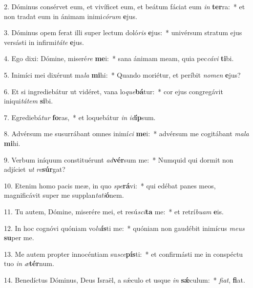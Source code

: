 2. Dóminus consérvet eum, et vivíficet eum, et beátum fáciat eum \textit{in} \textbf{ter}ra:~*  et non tradat eum in ánimam inimi\textit{có}\textit{rum} \textbf{e}jus.\

3. Dóminus opem ferat illi super lectum doló\textit{ris} \textbf{e}jus:~*  univérsum stratum ejus versásti in infirmi\textit{tá}\textit{te} \textbf{e}jus.\

4. Ego dixi: Dómine, miseré\textit{re} \textbf{me}i:~*  sana ánimam meam, quia pec\textit{cá}\textit{vi} \textbf{ti}bi.\

5. Inimíci mei dixérunt ma\textit{la} \textbf{mi}hi:~*  Quando moriétur, et períbit \textit{no}\textit{men} \textbf{e}jus?\

6. Et si ingrediebátur ut vidéret, vana lo\textit{que}\textbf{bá}tur:~*  cor ejus congregávit iniqui\textit{tá}\textit{tem} \textbf{si}bi.\

7. Egrediebá\textit{tur} \textbf{fo}ras,~*  et loquebátur \textit{in} \textit{id}\textbf{íp}sum.\

8. Advérsum me susurrábant omnes inimí\textit{ci} \textbf{me}i:~*  advérsum me cogitábant \textit{ma}\textit{la} \textbf{mi}hi.\

9. Verbum iníquum constituérunt \textit{ad}\textbf{vér}sum me:~*  Numquid qui dormit non adjíciet \textit{ut} \textit{re}\textbf{súr}gat?\

10. Etenim homo pacis meæ, in quo \textit{spe}\textbf{rá}vi:~*  qui edébat panes meos, magnificávit super me supplan\textit{ta}\textit{ti}\textbf{ó}nem.\

11. Tu autem, Dómine, miserére mei, et resú\textit{sci}\textbf{ta} me:~*  et retrí\textit{bu}\textit{am} \textbf{e}is.\

12. In hoc cognóvi quóniam vo\textit{lu}\textbf{ís}ti me:~*  quóniam non gaudébit inimícus \textit{me}\textit{us} \textbf{su}per me.\

13. Me autem propter innocéntiam su\textit{sce}\textbf{pís}ti:~*  et confirmásti me in conspéctu tuo \textit{in} \textit{æ}\textbf{tér}num.\

14. Benedíctus Dóminus, Deus Israël, a sǽculo et usque \textit{in} \textbf{sǽ}culum:~*  \textit{fi}\textit{at}, \textbf{fi}at.\


